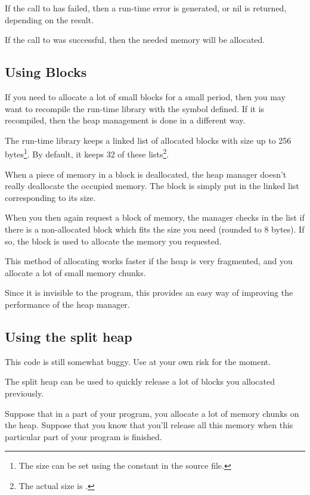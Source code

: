 If the call to  has failed, then a run-time error is generated,
or nil is returned, depending on the  result.

If the call to  was successful, then the needed memory will be
allocated.

\subsection{Using Blocks}
If you need to allocate a lot of small blocks for a small period, then you
may want to recompile the run-time library with the  symbol
defined. If it is recompiled, then the heap management is done in a
different way.

The run-time library keeps a linked list of allocated blocks with size
up to 256 bytes\footnote{The size can be set using the 
constant in the  source file.}. By default, it keeps 32 of
these lists\footnote{The actual size is .}.

When a piece of memory in a block is deallocated, the heap manager doesn't
really deallocate the occupied memory. The block is simply put in the linked
list corresponding to its size.

When you then again request a block of memory, the manager checks in the
list if there is a non-allocated block which fits the size you need (rounded
to 8 bytes). If so, the block is used to allocate the memory you requested.

This method of allocating works faster if the heap is very fragmented, and
you allocate a lot of small memory chunks.

Since it is invisible to the program, this provides an easy way of improving
the performance of the heap manager.

\subsection{Using the split heap}
\begin{remark}This code is still somewhat buggy. Use at your own risk for the moment.
\end{remark}

The split heap can be used to quickly release a lot of blocks you allocated
previously.

Suppose that in a part of your program, you allocate a lot of memory chunks
on the heap. Suppose that you know that you'll release all this memory when
this particular part of your program is finished.

